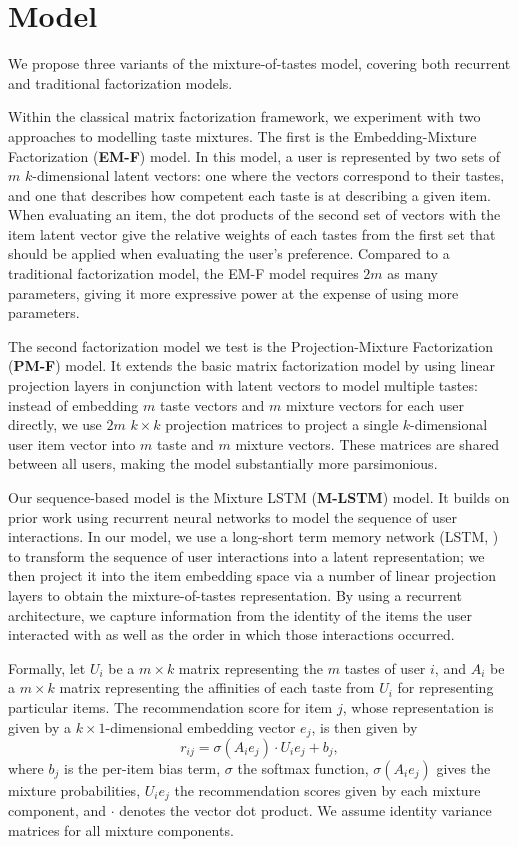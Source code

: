 \documentclass[sigconf]{acmart}
\begin{document}
\section{Model}
We propose three variants of the mixture-of-tastes model, covering both recurrent and traditional factorization models.

Within the classical matrix factorization framework, we experiment with two approaches to modelling taste mixtures. The first is the Embedding-Mixture Factorization (\textbf{EM-F}) model. In this model, a user is represented by two sets of $m$ $k$-dimensional latent vectors: one where the vectors correspond to their tastes, and one that describes how competent each taste is at describing a given item. When evaluating an item, the dot products of the second set of vectors with the item latent vector give the relative weights of each tastes from the first set that should be applied when evaluating the user's preference. Compared to a traditional factorization model, the EM-F model requires $2m$ as many parameters, giving it more expressive power at the expense of using more parameters.

The second factorization model we test is the Projection-Mixture Factorization (\textbf{PM-F}) model. It extends the basic matrix factorization model by using linear projection layers in conjunction with latent vectors to model multiple tastes: instead of embedding $m$ taste vectors and $m$ mixture vectors for each user directly, we use $2m$ $k \times k$ projection matrices to project a single $k$-dimensional user item vector into $m$ taste and $m$ mixture vectors. These matrices are shared between all users, making the model substantially more parsimonious.

Our sequence-based model is the Mixture LSTM (\textbf{M-LSTM}) model. It builds on prior work \citep{wu2017recurrent, hidasi2015session} using recurrent neural networks to model the sequence of user interactions. In our model, we use a long-short term memory network (LSTM, \cite{hochreiter1997long}) to transform the sequence of user interactions into a latent representation; we then project it into the item embedding space via a number of linear projection layers to obtain the mixture-of-tastes representation. By using a recurrent architecture, we capture information from the identity of the items the user interacted with as well as the order in which those interactions occurred.

Formally, let $U_i$ be a $m \times k$ matrix representing the $m$ tastes of user $i$, and $A_i$ be a $m \times k$ matrix representing the affinities of each taste from $U_i$ for representing particular items. The recommendation score for item $j$, whose representation is given by a $k \times 1$-dimensional embedding vector $e_j$, is then given by
\begin{equation}
  r_{ij} = \sigma\left(A_ie_j\right) \cdot U_ie_j + b_j,
\end{equation}
where $b_j$ is the per-item bias term, $\sigma$ the softmax function, $\sigma\left(A_ie_j\right)$ gives the mixture probabilities, $U_ie_j$ the recommendation scores given by each mixture component, and $\cdot$ denotes the vector dot product. We assume identity variance matrices for all mixture components.
\end{document}
